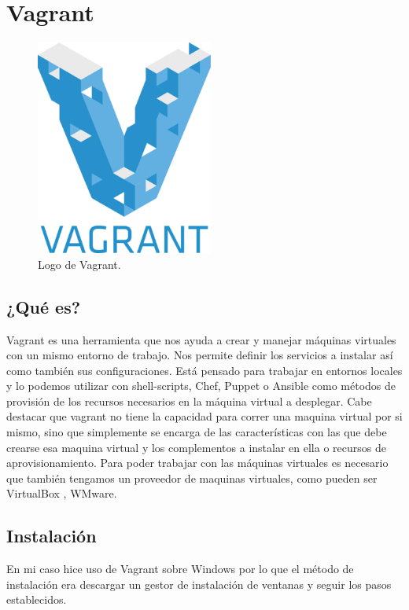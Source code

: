 \appendix
\clearpage
\addappheadtotoc
\appendixpage
\chapter{Vagrant}
\begin{figure}[!htb]
  \centering
    \includegraphics[width=0.3\linewidth]{./img/anexos/1.png}
    \caption{Logo de Vagrant.}
  \label{fig:yo}
\end{figure}
\section{¿Qué es?}
Vagrant es una herramienta que nos ayuda a crear y manejar máquinas virtuales con un mismo entorno de trabajo. Nos permite definir los servicios a instalar así como también sus configuraciones. Está pensado para trabajar en entornos locales y lo podemos utilizar con shell-scripts, Chef, Puppet o Ansible como métodos de provisión de los recursos necesarios en la máquina virtual a desplegar.\newline
\newline
Cabe destacar que vagrant no tiene la capacidad para correr una maquina virtual por si mismo, sino que simplemente se encarga de las características con las que debe crearse esa maquina virtual y los complementos a instalar en ella o recursos de aprovisionamiento. Para poder trabajar con las máquinas virtuales es necesario que también tengamos un proveedor de maquinas virtuales, como pueden ser  VirtualBox , WMware.

\section{Instalación}

En mi caso hice uso de Vagrant sobre Windows por lo que el método de instalación era descargar un gestor de instalación de ventanas y seguir los pasos establecidos.

